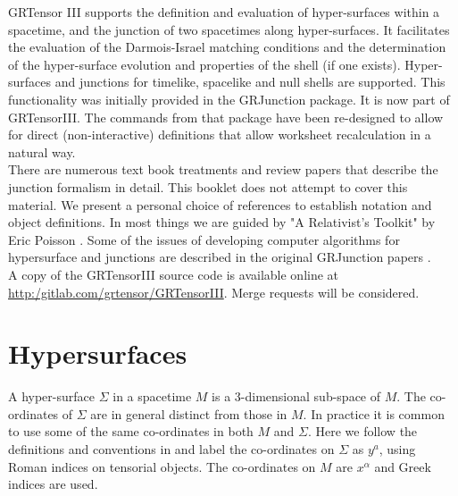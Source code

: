 \documentclass{article}
\begin{document}
\grtitle{\grHyperTitle}
\grlabel{\grHyperLabel}
\grtitlepage
%
\copyrightpage
\noindent 
GRTensor III supports the definition and evaluation of hyper-surfaces within a spacetime, and the junction
of two spacetimes along hyper-surfaces. It facilitates the evaluation of the Darmois-Israel matching conditions
and the determination of the hyper-surface evolution and properties of the shell (if one exists). 
Hyper-surfaces and junctions for timelike, spacelike and null shells are supported. This functionality was
initially provided in the GRJunction package. It is now part of GRTensorIII. The commands from that package have been re-designed to allow for
direct (non-interactive) definitions that allow worksheet recalculation in a natural way. \\

There are numerous text book treatments and review papers that describe the junction formalism in detail. This
booklet does not attempt to cover this material. We present a personal choice of references to establish notation
and object definitions. In most things we are guided by "A Relativist's Toolkit" by Eric Poisson \cite{poisson:2004}.
Some of the issues of developing computer algorithms for hypersurface and junctions are described in the original 
GRJunction papers \cite{musgravelake:1996, musgravelake:1997}. \\

A copy of the GRTensorIII source code is available online at 
\href{url}{http:/gitlab.com/grtensor/GRTensorIII}. Merge requests
will be considered. \\

%
\section{Hypersurfaces}
A hyper-surface $\Sigma$ in a spacetime $M$ is a 3-dimensional sub-space of $M$. The co-ordinates of $\Sigma$ are in 
general distinct from those in $M$. In practice it is common to use some of the same co-ordinates in both $M$ and $\Sigma$. 
Here we follow the definitions and conventions in \cite{poisson:2004} and label the co-ordinates on $\Sigma$ as $y^a$, using Roman indices on tensorial objects. The co-ordinates on $M$ are $x^\alpha$ and Greek indices are used. \\
\end{document}
